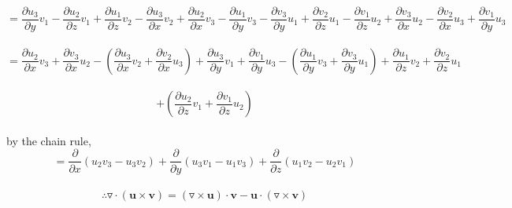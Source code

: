 \documentclass{amsart}
\begin{document}
	\[ = \frac{\partial u_3}{\partial y}v_1 - \frac{\partial u_2}{\partial z}v_1 +
	\frac{\partial u_1}{\partial z}v_2 - \frac{\partial u_3}{\partial x}v_2 +
	\frac{\partial u_2}{\partial x}v_3 - \frac{\partial u_1}{\partial y}v_3 - 
	\frac{\partial v_3}{\partial y}u_1 + \frac{\partial v_2}{\partial z}u_1 -
	\frac{\partial v_1}{\partial z}u_2 + \frac{\partial v_3}{\partial x}u_2 -
	\frac{\partial v_2}{\partial x}u_3 + \frac{\partial v_1}{\partial y}u_3
	\]
	\\
	
	\[ = \frac{\partial u_2}{\partial x}v_3 + \frac{\partial v_3}{\partial x}u_2 - \left( \frac{\partial u_3}{\partial x}v_2 +  \frac{\partial v_2}{\partial x}u_3\right) + \frac{\partial u_3}{\partial y}v_1 + \frac{\partial v_1}{\partial y}u_3 - \left( \frac{\partial u_1}{\partial y}v_3 + \frac{\partial v_3}{\partial y}u_1 \right) + \frac{\partial u_1}{\partial z}v_2 + \frac{\partial v_2}{\partial z}u_1 \]\\\[+ \left( \frac{\partial u_2}{\partial z}v_1 + \frac{\partial v_1}{\partial z}u_2\right)
	\]\\
	by the chain rule,\\
	\[ =\frac{\partial}{\partial x}(u_2v_3 - u_3v_2) + \frac{\partial}{\partial y}(u_3v_1 - u_1v_3) + 
	\frac{\partial}{\partial z}(u_1v_2 - u_2v_1)
	\]\\
	
	\[ \therefore \triangledown \cdot (\mathbf{u} \times \mathbf{v}) = (\triangledown \times \mathbf{u}) \cdot \mathbf{v} - \mathbf{u} \cdot (\triangledown \times \mathbf{v})
	\]
	\\\\
\end{document}
